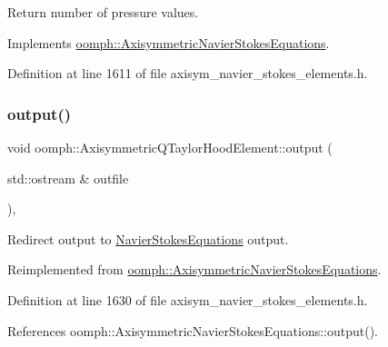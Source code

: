 Return number of pressure values. 



Implements \hyperlink{classoomph_1_1AxisymmetricNavierStokesEquations_a89edaffb4913131cc14a5f6e45ed117a}{oomph\+::\+Axisymmetric\+Navier\+Stokes\+Equations}.



Definition at line 1611 of file axisym\+\_\+navier\+\_\+stokes\+\_\+elements.\+h.

\mbox{\label{classoomph_1_1AxisymmetricQTaylorHoodElement_aa092b03db26878057c3d3c92496d752d}} 
\subsubsection{\texorpdfstring{output()}{output()}\hspace{0.1cm}{\footnotesize\ttfamily [1/4]}}
{\footnotesize\ttfamily void oomph\+::\+Axisymmetric\+Q\+Taylor\+Hood\+Element\+::output (\begin{DoxyParamCaption}\item[{std\+::ostream \&}]{outfile }\end{DoxyParamCaption})\hspace{0.3cm}{\ttfamily [inline]}, {\ttfamily [virtual]}}



Redirect output to \hyperlink{classoomph_1_1NavierStokesEquations}{Navier\+Stokes\+Equations} output. 



Reimplemented from \hyperlink{classoomph_1_1AxisymmetricNavierStokesEquations_afe0c7b607ec3fd03a73b7db4f1fe6252}{oomph\+::\+Axisymmetric\+Navier\+Stokes\+Equations}.



Definition at line 1630 of file axisym\+\_\+navier\+\_\+stokes\+\_\+elements.\+h.



References oomph\+::\+Axisymmetric\+Navier\+Stokes\+Equations\+::output().

\mbox{\label{classoomph_1_1AxisymmetricQTaylorHoodElement_a73bc9729dd01b61e467d4fdc7d8b802c}} 
